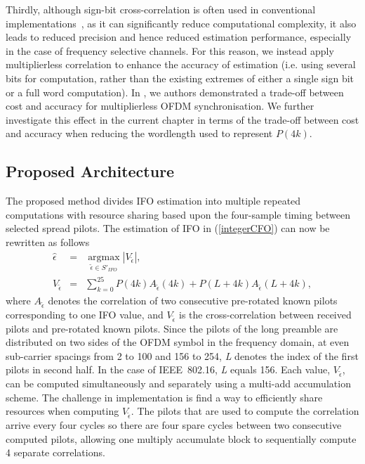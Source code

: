 Thirdly, although sign-bit cross-correlation is often used in conventional implementations~\cite{Kim2008,Schwoerer2002}, as it can significantly reduce computational complexity, it also leads to reduced precision and hence reduced estimation performance, especially in the case of frequency selective channels.
For this reason, we instead apply multiplierless correlation to enhance the accuracy of estimation (i.e. using several bits for computation, rather than the existing extremes of either a single sign bit or a full word computation).
In \cite{Pham2012}, we authors demonstrated a trade-off between cost and accuracy for multiplierless OFDM synchronisation.
We further investigate this effect in the current chapter in terms of the trade-off between cost and accuracy when reducing the wordlength used to represent $P(4k)$.

\subsection{Proposed Architecture}
\label{subsec:Imple}
The proposed method divides IFO estimation into multiple repeated computations with resource sharing based upon the four-sample timing between selected spread pilots.
The estimation of IFO in (\ref{integerCFO}) can now be rewritten as follows
\begin{eqnarray}
\label{proposedimplementIFO}
\hat{\epsilon}  &=&\underset{\tilde{\epsilon} \in S'_{IFO}}{\operatorname{argmax}}  \left|V_{\tilde{\epsilon}}  \right|,	 \nonumber \\
V_{\tilde{\epsilon}} &=& \sum_{k=0}^{25} P(4k) A_{\tilde{\epsilon}}(4k) + P(L+4k)  A_{\tilde{\epsilon}}(L+4k),
\end{eqnarray}
where $A_{\tilde{\epsilon}}$ denotes the correlation of two consecutive pre-rotated known pilots corresponding to one IFO value, and $V_{\tilde{\epsilon}}$ is the cross-correlation between received pilots and pre-rotated known pilots.
Since the pilots of the long preamble are distributed on two sides of the OFDM symbol in the frequency domain, at even sub-carrier spacings from 2 to 100 and 156 to 254, \emph{L} denotes the index of the first pilots in second half.
In the case of IEEE~802.16, \emph{L} equals 156.
Each value, $V_{\tilde{\epsilon}}$, can be computed simultaneously and separately using a multi-add accumulation scheme.
The challenge in implementation is find a way to efficiently share resources when computing $V_{\tilde{\epsilon}}$.
The pilots that are used to compute the correlation arrive every four cycles so there are four spare cycles between two consecutive computed pilots, allowing one multiply accumulate block to sequentially compute 4 separate correlations.

